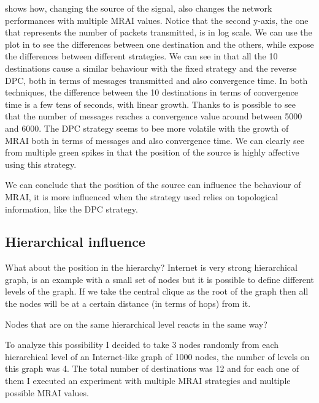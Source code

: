  shows how, changing the source of the signal,
also changes the network performances with multiple \ac{MRAI} values.
Notice that the second y-axis, the one that represents the number of packets
transmitted, is in log scale.
We can use the plot in  to see the
differences between one destination and the others, while 
expose the differences between different strategies.
We can see in  that all the \num{10} destinations
cause a similar behaviour with the fixed strategy and the reverse \ac{DPC}, both
in terms of messages transmitted and also convergence time.
In both techniques, the difference between the \num{10} destinations in terms of
convergence time is a few tens of seconds, with linear growth.
Thanks to  is possible to see that the
number of messages reaches a convergence value around between \num{5000} and
\num{6000}.
The \ac{DPC} strategy seems to bee more volatile with the growth of \ac{MRAI}
both in terms of messages and also convergence time.
We can clearly see from multiple green spikes in 
that the position of the source is highly affective using this strategy.


We can conclude that the position of the source can influence the behaviour
of \ac{MRAI}, it is more influenced when the strategy used relies on topological
information, like the \ac{DPC} strategy.

\subsection{Hierarchical influence}
\label{subsec:hierarchical_influence}

What about the position in the hierarchy?
Internet is very strong hierarchical graph, 
is an example with a small set of nodes but it is possible to define different levels
of the graph.
If we take the central clique as the root of the graph then all the nodes will
be at a certain distance (in terms of hops) from it.

Nodes that are on the same hierarchical level reacts in the same way?

To analyze this possibility I decided to take \num{3} nodes randomly from each
hierarchical level of an Internet-like graph of \num{1000} nodes, the number
of levels on this graph was \num{4}.
The total number of destinations was \num{12} and for each one of them I executed
an experiment with multiple \ac{MRAI} strategies and multiple possible \ac{MRAI}
values.

